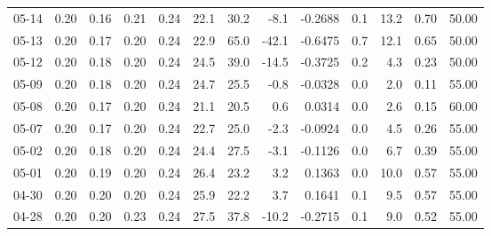 \begin{threeparttable}
{\begin{tabular}{lrrrrrrrrrrrr}
  05-14 &          0.20 &          0.16 &          0.21 &        0.24 &                22.1 &                30.2 &       -8.1 &      -0.2688 &                 0.1 &             13.2 &            0.70 &                  50.00 \\
  05-13 &          0.20 &          0.17 &          0.20 &        0.24 &                22.9 &                65.0 &      -42.1 &      -0.6475 &                 0.7 &             12.1 &            0.65 &                  50.00 \\
  05-12 &          0.20 &          0.18 &          0.20 &        0.24 &                24.5 &                39.0 &      -14.5 &      -0.3725 &                 0.2 &              4.3 &            0.23 &                  50.00 \\
  05-09 &          0.20 &          0.18 &          0.20 &        0.24 &                24.7 &                25.5 &       -0.8 &      -0.0328 &                 0.0 &              2.0 &            0.11 &                  55.00 \\
  05-08 &          0.20 &          0.17 &          0.20 &        0.24 &                21.1 &                20.5 &        0.6 &       0.0314 &                 0.0 &              2.6 &            0.15 &                  60.00 \\
  05-07 &          0.20 &          0.17 &          0.20 &        0.24 &                22.7 &                25.0 &       -2.3 &      -0.0924 &                 0.0 &              4.5 &            0.26 &                  55.00 \\
  05-02 &          0.20 &          0.18 &          0.20 &        0.24 &                24.4 &                27.5 &       -3.1 &      -0.1126 &                 0.0 &              6.7 &            0.39 &                  55.00 \\
  05-01 &          0.20 &          0.19 &          0.20 &        0.24 &                26.4 &                23.2 &        3.2 &       0.1363 &                 0.0 &             10.0 &            0.57 &                  55.00 \\
  04-30 &          0.20 &          0.20 &          0.20 &        0.24 &                25.9 &                22.2 &        3.7 &       0.1641 &                 0.1 &              9.5 &            0.57 &                  55.00 \\
  04-28 &          0.20 &          0.20 &          0.23 &        0.24 &                27.5 &                37.8 &      -10.2 &      -0.2715 &                 0.1 &              9.0 &            0.52 &                  55.00 \\

\end{tabular}}
\end{threeparttable}
